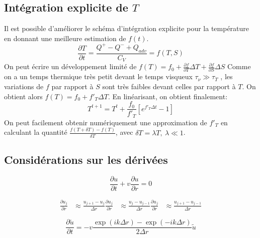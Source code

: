 \subsection{Intégration explicite de $T$}
\label{ssec:integration_T}
Il est possible d'améliorer le schéma d'intégration explicite pour la température en donnant une meilleure estimation de $f(t)$.
\begin{equation}
  \frac{\partial T}{\partial t} = \frac{Q^+ - Q^- + Q_{adv}}{C_V} = f(T, S)
\end{equation}
On peut écrire un développement limité de $f(T) = f_0 + \frac{\partial f}{\partial T}\Delta T + \frac{\partial f}{\partial S}\Delta S$
Comme on a un temps thermique très petit devant le temps visqueux $\tau_\nu \gg \tau_T$ 
, les variations de $f$ par rapport à $S$ sont très faibles devant celles par rapport à $T$. On obtient alors $f(T) = f_0 + f'_T \Delta T$. En linéarisant, on obtient finalement:
\begin{equation}
  T^{t+1} = T^t + \frac{f_0}{f'_T}\left[e^{f'_T\Delta t} - 1 \right] 
\end{equation}
On peut facilement obtenir numériquement une approximation de $f'_T$ en calculant la quantité $\frac{f(T+\delta T) - f(T)}{\delta T}$, avec $\delta T = \lambda T,\ \lambda \ll 1$. 

\subsection{Considérations sur les dérivées}

\begin{equation}
    \frac{\partial u}{\partial t} + v \frac{\partial u}{\partial r} = 0
\end{equation}

\begin{align}
    \frac{\partial u_j}{\partial r} &\approx \frac{u_{j+1} - u_j}{\Delta{r}}
    \frac{\partial u_j}{\partial r} &\approx \frac{u_j - u_{j-1}}{\Delta{r}}
    \frac{\partial u_j}{\partial r} &\approx \frac{u_{j+1} - u_{j-1}}{\Delta{r}}
\end{align}

\begin{equation}
    \frac{\partial \tilde{u}}{\partial t} = - v \frac{\exp(ik\Delta{r}) - \exp(-ik\Delta{r})}{2 \Delta{r}} \tilde{u}
\end{equation}


